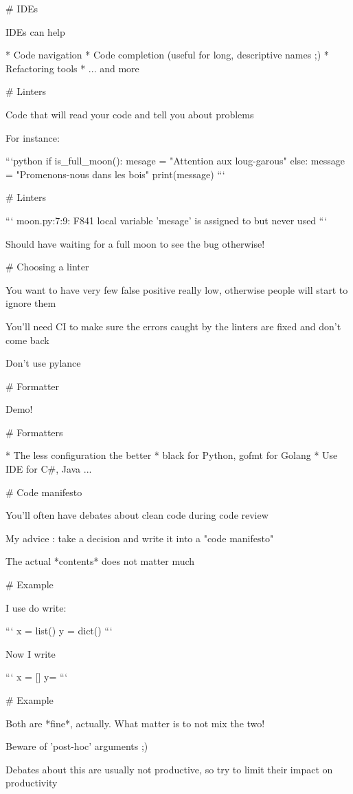 # IDEs

IDEs can help

* Code navigation
* Code completion (useful for long, descriptive names ;)
* Refactoring tools
* ... and more

# Linters

Code that will read your code and tell you about problems

For instance:

```python
if is_full_moon():
    mesage = "Attention aux loug-garous"
else:
    message = "Promenons-nous dans les bois"
print(message)
```

# Linters

```
moon.py:7:9: F841 local variable 'mesage' is assigned to but never used
```

Should have waiting for a full moon to see the bug otherwise!

# Choosing a linter

You want to have very few false positive really low, otherwise people will start to ignore them

You'll need CI to make sure the errors caught by the linters are fixed and don't come back

Don't use pylance

# Formatter

Demo!

# Formatters

* The less configuration the better
* black for Python, gofmt for Golang
* Use IDE for C#, Java
...

# Code manifesto

You'll often have debates about clean code during code review

My advice : take a decision and write it into a "code manifesto"

The actual *contents* does not matter much

# Example

I use do write:

```
x = list()
y = dict()
```

Now I write

```
x = []
y= {}
```

# Example

Both are *fine*, actually. What matter is to not mix the two!

Beware of 'post-hoc' arguments ;)

Debates about this are usually not productive, so try to limit their impact
on productivity
